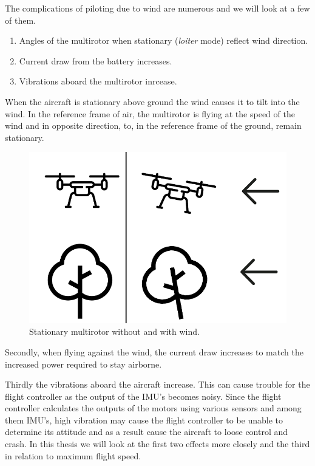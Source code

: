\documentclass[12pt,oneside]{reedthesis}
\theoremstyle{definition}
\theoremstyle{definition}
\theoremstyle{definition}
\theoremstyle{remark}
\begin{document}
The complications of piloting due to wind are numerous and we will look
at a few of them.
\begin{enumerate}
\def\labelenumi{\arabic{enumi}.}
\item
  Angles of the multirotor when stationary (\emph{loiter} mode) reflect
  wind direction.
\item
  Current draw from the battery increases.
\item
  Vibrations aboard the multirotor inrcease.
\end{enumerate}
When the aircraft is stationary above ground the wind causes it to tilt
into the wind. In the reference frame of air, the multirotor is flying
at the speed of the wind and in opposite direction, to, in the reference
frame of the ground, remain stationary.
\begin{figure}
\centering
\includegraphics{./figure/wind.PNG}
\caption[\label{fig:wind}Stationary multirotor without and with
wind.]{\label{fig:wind}Stationary multirotor without and with
wind.\footnotemark{}}
\end{figure}

Secondly, when flying against the wind, the current draw increases to
match the increased power required to stay airborne.

Thirdly the vibrations aboard the aircraft increase. This can cause
trouble for the flight controller as the output of the IMU's becomes
noisy. Since the flight controller calculates the outputs of the motors
using various sensors and among them IMU's, high vibration may cause the
flight controller to be unable to determine its attitude and as a result
cause the aircraft to loose control and crash. In this thesis we will
look at the first two effects more closely and the third in relation to
maximum flight speed.
\end{document}
